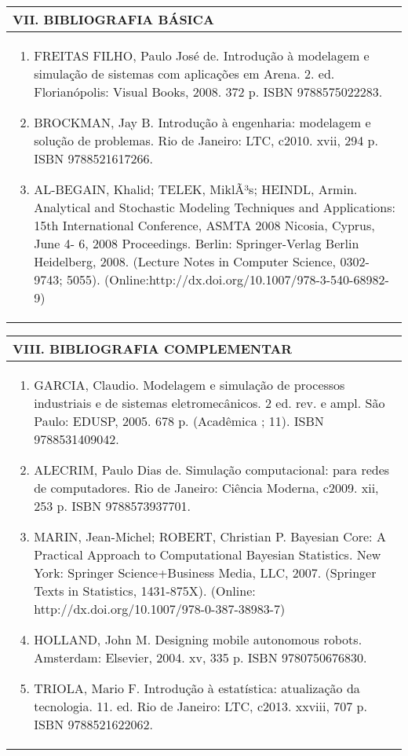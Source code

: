 \documentclass[12pt]{article}
\begin{document}
\newpage

\begin{longtable}{|L{1.025\textwidth}|} \hline
%
{\bf VII. BIBLIOGRAFIA BÁSICA} \\ \hline
\begin{enumerate}
%
\item FREITAS FILHO, Paulo José de. Introdução à modelagem e simulação de sistemas com aplicações em Arena. 2. ed. Florianópolis: Visual Books, 2008. 372 p. ISBN 9788575022283.
\item BROCKMAN, Jay B. Introdução à engenharia: modelagem e solução de problemas. Rio de Janeiro: LTC, c2010. xvii, 294 p. ISBN 9788521617266. 
\item AL-BEGAIN, Khalid; TELEK, MiklÃ³s; HEINDL, Armin. Analytical and Stochastic Modeling Techniques and Applications: 15th International Conference, ASMTA 2008 Nicosia, Cyprus, June 4- 6, 2008 Proceedings. Berlin: Springer-Verlag Berlin Heidelberg, 2008. (Lecture Notes in Computer Science, 0302-9743; 5055). (Online:http://dx.doi.org/10.1007/978-3-540-68982-9)

\end{enumerate}
 \\ \hline
\end{longtable}


\newpage

\begin{longtable}{|L{1.025\textwidth}|} \hline
%
{\bf VIII. BIBLIOGRAFIA COMPLEMENTAR} \\ \hline
\begin{enumerate}
\item GARCIA, Claudio. Modelagem e simulação de processos industriais e de sistemas eletromecânicos. 2 ed. rev. e ampl. São Paulo: EDUSP, 2005. 678 p. (Acadêmica ; 11). ISBN 9788531409042. 
\item ALECRIM, Paulo Dias de. Simulação computacional: para redes de computadores. Rio de Janeiro: Ciência Moderna, c2009. xii, 253 p. ISBN 9788573937701. 
\item MARIN, Jean-Michel; ROBERT, Christian P. Bayesian Core: A Practical Approach to Computational Bayesian Statistics. New York: Springer Science+Business Media, LLC, 2007. (Springer Texts in Statistics, 1431-875X). (Online: http://dx.doi.org/10.1007/978-0-387-38983-7)
\item HOLLAND, John M. Designing mobile autonomous robots. Amsterdam: Elsevier, 2004. xv, 335 p. ISBN 9780750676830. 
\item TRIOLA, Mario F. Introdução à estatística: atualização da tecnologia. 11. ed. Rio de Janeiro: LTC, c2013. xxviii, 707 p. ISBN 9788521622062.


\end{enumerate}
 \\ \hline
\end{longtable}



\end{document}
